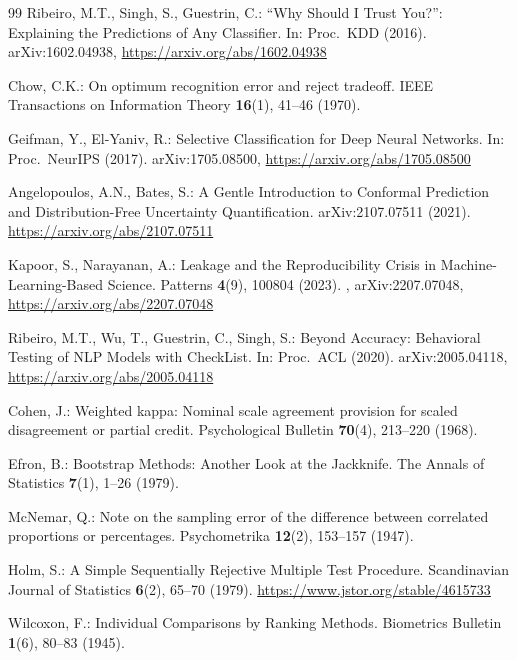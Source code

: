 \documentclass[runningheads]{llncs}
\begin{document}
\begin{thebibliography}{99}
Ribeiro, M.T., Singh, S., Guestrin, C.: ``Why Should I Trust You?'': Explaining the Predictions of Any Classifier. In: Proc.\ KDD (2016). arXiv:1602.04938, \url{https://arxiv.org/abs/1602.04938}

Chow, C.K.: On optimum recognition error and reject tradeoff. IEEE Transactions on Information Theory \textbf{16}(1), 41--46 (1970). 

Geifman, Y., El-Yaniv, R.: Selective Classification for Deep Neural Networks. In: Proc.\ NeurIPS (2017). arXiv:1705.08500, \url{https://arxiv.org/abs/1705.08500}

Angelopoulos, A.N., Bates, S.: A Gentle Introduction to Conformal Prediction and Distribution-Free Uncertainty Quantification. arXiv:2107.07511 (2021). \url{https://arxiv.org/abs/2107.07511}

Kapoor, S., Narayanan, A.: Leakage and the Reproducibility Crisis in Machine-Learning-Based Science. Patterns \textbf{4}(9), 100804 (2023). , arXiv:2207.07048, \url{https://arxiv.org/abs/2207.07048}

Ribeiro, M.T., Wu, T., Guestrin, C., Singh, S.: Beyond Accuracy: Behavioral Testing of NLP Models with CheckList. In: Proc.\ ACL (2020). arXiv:2005.04118, \url{https://arxiv.org/abs/2005.04118}

Cohen, J.: Weighted kappa: Nominal scale agreement provision for scaled disagreement or partial credit. Psychological Bulletin \textbf{70}(4), 213--220 (1968). 

Efron, B.: Bootstrap Methods: Another Look at the Jackknife. The Annals of Statistics \textbf{7}(1), 1--26 (1979). 

McNemar, Q.: Note on the sampling error of the difference between correlated proportions or percentages. Psychometrika \textbf{12}(2), 153--157 (1947). 

Holm, S.: A Simple Sequentially Rejective Multiple Test Procedure. Scandinavian Journal of Statistics \textbf{6}(2), 65--70 (1979). \url{https://www.jstor.org/stable/4615733}

Wilcoxon, F.: Individual Comparisons by Ranking Methods. Biometrics Bulletin \textbf{1}(6), 80--83 (1945). 



\end{thebibliography}
\end{document}
